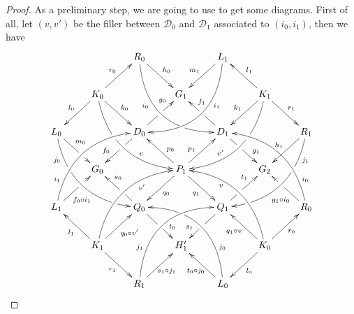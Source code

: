 \documentclass[a4paper]{article}
\newcommand{\dder}[1]{\mathscr{#1}}
\theoremstyle{definition}
\begin{document}
\begin{proof}  As a preliminary step, we are going to use  to get some diagrams.  First of all, let $(v,v')$ be the filler between $\dder{D}_0$ and $\dder{D}_1$ associated to $(i_0, i_1)$, then we have
	\[\xymatrix{&&R_0 \ar@/_1cm/[ddrr]_(.35){i_0}|(.7)\hole \ar[dr]^{h_0}&& L_1\ar@/^1cm/[ddll]^(.35){i_1}  \ar[dl]_{m_1}\\&K_0\ar[dr]^{k_0}\ar[dl]_{l_0} \ar@/_.8cm/[ddrr]|(.36)\hole^(.65){v}\ar[ur]^{r_0}&& G_1 && K_1 \ar@/^.8cm/[ddll]|(.36)\hole_(.65){v'}\ar[dl]_{k_1}\ar[lu]_{l_1} \ar[dr]^{r_1}\\L_0 \ar@/_.8cm/[ddrr]_(.2){j_0}|(.31)\hole|(.81)\hole \ar[dr]^(.4){m_0}|(.61)\hole && D_0 \ar[dl]|(.4)\hole_(.65){f_0}\ar[ur]|(.5)\hole^(.7){g_0}&&D_1 \ar[dr]|(.4)\hole^(.65){g_1} \ar[ul]|(.5)\hole_(.65){f_1}&&R_1\ar@/^.8cm/[ddll]^(.2){j_1}|(.31)\hole|(.81)\hole\ar[dl]_{h_1}\\&G_0 &&P_1\ar[dr]_{q_1} \ar[dl]^{q_0}\ar[ur]^(.4){p_1}\ar[ul]_(.4){p_0}&&G_2\\L_1 \ar@/^.8cm/[uurr]^(.2){i_1} \ar[ur]_(.35){f_0\circ i_1}|(.61)\hole&&Q_0 \ar[ul]|(.4)\hole_(.65){s_0}\ar[dr]|(.5)\hole^(.65){t_0} &&Q_1\ar[ur]|(.4)\hole^(.65){t_1} \ar[dl]|(.5)\hole_(.65){s_1} && R_0  \ar[ul]^(.35){g_1\circ i_0}|(.61)\hole\ar@/_.8cm/[uull]_(.2){i_0}\\&K_1 \ar[ur]_{q_0\circ v'} \ar[dr]_{r_1} \ar[ul]^{l_1}\ar@/^.8cm/[uurr]_(.65){v'}&&H'_1&& K_0 \ar[ur]_{r_0} \ar[ul]^{q_1\circ v} \ar[dl]^{l_0} \ar@/_.8cm/[uull]^(.65){v}\\&& R_1 \ar[ur]_{\hspace{-5pt}s_1\circ j_1}\ar@/^1cm/[uurr]^(.25){j_1}&& L_0 \ar[ul]^{t_0\circ j_0\hspace{-5pt}} \ar@/_1cm/[uull]_(.25){j_0} |(.69)\hole }\]
	

\end{proof}
\end{document}
